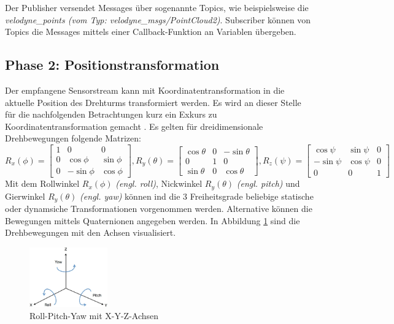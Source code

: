 Der Publisher versendet Messages über sogenannte Topics, wie beispielsweise die \textit{velodyne\_points (vom Typ: velodyne\_msgs/PointCloud2)}. Subscriber können von Topics die Messages mittels einer Callback-Funktion an Variablen übergeben.

\subsection{Phase 2: Positionstransformation}
\label{subsec:Phase}

Der empfangene Sensorstream kann mit Koordinatentransformation in die aktuelle Position des Drehturms transformiert werden. Es wird an dieser Stelle für die nachfolgenden Betrachtungen kurz ein Exkurs zu Koordinatentransformation gemacht \cite{Koordinaten}.
Es gelten für dreidimensionale Drehbewegungen folgende Matrizen:\\

$R_x(\phi ) =\begin{bmatrix}
	1&  0& 0\\ 
	0&  \cos\phi&  \sin\phi\\ 
	0&  -\sin\phi&  \cos\phi
\end{bmatrix}, R_y(\theta ) = \begin{bmatrix}
	\cos\theta&  0& -\sin\theta \\ 
	0&  1& 0\\ 
	\sin\theta &  0& \cos\theta 
\end{bmatrix}, R_z(\psi ) =\begin{bmatrix}
	\cos\psi& \sin\psi  & 0 \\ 
	-\sin\psi&  \cos\psi& 0 \\ 
	0&  0& 1
\end{bmatrix}$\\

Mit dem Rollwinkel $R_x(\phi)$ \textit{(engl. roll)}, Nickwinkel $R_y(\theta )$ \textit{(engl. pitch)} und Gierwinkel $R_y(\theta )$ \textit{(engl. yaw)} können ind die 3 Freiheitsgrade beliebige statische oder dynamsiche Transformationen vorgenommen werden. Alternative können die Bewegungen mittels \ac{Quaternionen} angegeben werden. In Abbildung \ref{fig:rollpitchyaw} sind die Drehbewegungen mit den Achsen visualisiert.

\begin{figure}[H]
		\centering
	\includegraphics[width=0.3\textwidth]{resources/rollpitchyaw.png}
	\caption[{Roll-Pitch-Yaw mit X-Y-Z-Achsen}]{Roll-Pitch-Yaw mit X-Y-Z-Achsen}
	\label{fig:rollpitchyaw}
\end{figure} 

